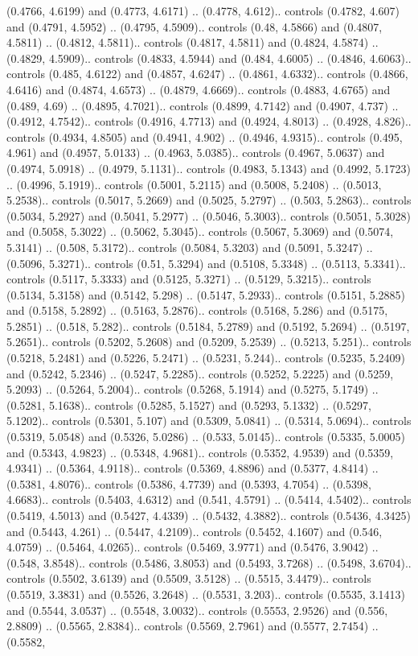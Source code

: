(0.4766, 4.6199) and (0.4773, 4.6171) .. (0.4778, 4.612).. controls (0.4782, 4.607) and (0.4791, 4.5952) .. (0.4795, 4.5909).. controls (0.48, 4.5866) and (0.4807, 4.5811) .. (0.4812, 4.5811).. controls (0.4817, 4.5811) and (0.4824, 4.5874) .. (0.4829, 4.5909).. controls (0.4833, 4.5944) and (0.484, 4.6005) .. (0.4846, 4.6063).. controls (0.485, 4.6122) and (0.4857, 4.6247) .. (0.4861, 4.6332).. controls (0.4866, 4.6416) and (0.4874, 4.6573) .. (0.4879, 4.6669).. controls (0.4883, 4.6765) and (0.489, 4.69) .. (0.4895, 4.7021).. controls (0.4899, 4.7142) and (0.4907, 4.737) .. (0.4912, 4.7542).. controls (0.4916, 4.7713) and (0.4924, 4.8013) .. (0.4928, 4.826).. controls (0.4934, 4.8505) and (0.4941, 4.902) .. (0.4946, 4.9315).. controls (0.495, 4.961) and (0.4957, 5.0133) .. (0.4963, 5.0385).. controls (0.4967, 5.0637) and (0.4974, 5.0918) .. (0.4979, 5.1131).. controls (0.4983, 5.1343) and (0.4992, 5.1723) .. (0.4996, 5.1919).. controls (0.5001, 5.2115) and (0.5008, 5.2408) .. (0.5013, 5.2538).. controls (0.5017, 5.2669) and (0.5025, 5.2797) .. (0.503, 5.2863).. controls (0.5034, 5.2927) and (0.5041, 5.2977) .. (0.5046, 5.3003).. controls (0.5051, 5.3028) and (0.5058, 5.3022) .. (0.5062, 5.3045).. controls (0.5067, 5.3069) and (0.5074, 5.3141) .. (0.508, 5.3172).. controls (0.5084, 5.3203) and (0.5091, 5.3247) .. (0.5096, 5.3271).. controls (0.51, 5.3294) and (0.5108, 5.3348) .. (0.5113, 5.3341).. controls (0.5117, 5.3333) and (0.5125, 5.3271) .. (0.5129, 5.3215).. controls (0.5134, 5.3158) and (0.5142, 5.298) .. (0.5147, 5.2933).. controls (0.5151, 5.2885) and (0.5158, 5.2892) .. (0.5163, 5.2876).. controls (0.5168, 5.286) and (0.5175, 5.2851) .. (0.518, 5.282).. controls (0.5184, 5.2789) and (0.5192, 5.2694) .. (0.5197, 5.2651).. controls (0.5202, 5.2608) and (0.5209, 5.2539) .. (0.5213, 5.251).. controls (0.5218, 5.2481) and (0.5226, 5.2471) .. (0.5231, 5.244).. controls (0.5235, 5.2409) and (0.5242, 5.2346) .. (0.5247, 5.2285).. controls (0.5252, 5.2225) and (0.5259, 5.2093) .. (0.5264, 5.2004).. controls (0.5268, 5.1914) and (0.5275, 5.1749) .. (0.5281, 5.1638).. controls (0.5285, 5.1527) and (0.5293, 5.1332) .. (0.5297, 5.1202).. controls (0.5301, 5.107) and (0.5309, 5.0841) .. (0.5314, 5.0694).. controls (0.5319, 5.0548) and (0.5326, 5.0286) .. (0.533, 5.0145).. controls (0.5335, 5.0005) and (0.5343, 4.9823) .. (0.5348, 4.9681).. controls (0.5352, 4.9539) and (0.5359, 4.9341) .. (0.5364, 4.9118).. controls (0.5369, 4.8896) and (0.5377, 4.8414) .. (0.5381, 4.8076).. controls (0.5386, 4.7739) and (0.5393, 4.7054) .. (0.5398, 4.6683).. controls (0.5403, 4.6312) and (0.541, 4.5791) .. (0.5414, 4.5402).. controls (0.5419, 4.5013) and (0.5427, 4.4339) .. (0.5432, 4.3882).. controls (0.5436, 4.3425) and (0.5443, 4.261) .. (0.5447, 4.2109).. controls (0.5452, 4.1607) and (0.546, 4.0759) .. (0.5464, 4.0265).. controls (0.5469, 3.9771) and (0.5476, 3.9042) .. (0.548, 3.8548).. controls (0.5486, 3.8053) and (0.5493, 3.7268) .. (0.5498, 3.6704).. controls (0.5502, 3.6139) and (0.5509, 3.5128) .. (0.5515, 3.4479).. controls (0.5519, 3.3831) and (0.5526, 3.2648) .. (0.5531, 3.203).. controls (0.5535, 3.1413) and (0.5544, 3.0537) .. (0.5548, 3.0032).. controls (0.5553, 2.9526) and (0.556, 2.8809) .. (0.5565, 2.8384).. controls (0.5569, 2.7961) and (0.5577, 2.7454) .. (0.5582, 